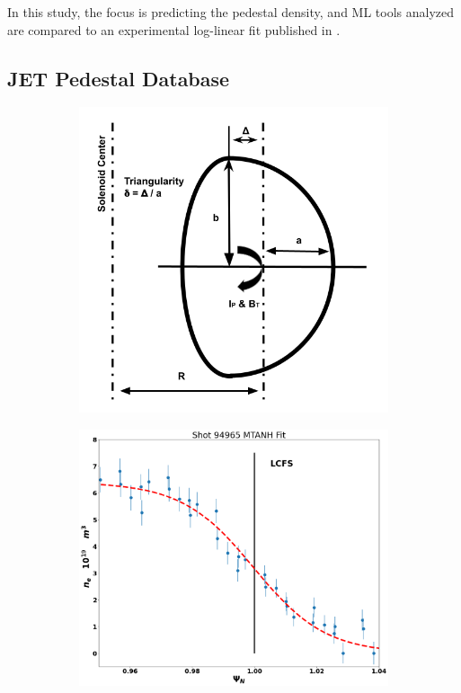 \documentclass[a4paper, twoside, final, 12pt]{article}
\begin{document}
In this study, the focus is predicting the pedestal density, and ML tools analyzed are compared to an experimental log-linear fit published in \cite{Frassinetti_2020}.

\subsection{JET Pedestal Database}
\begin{figure}
	\centering
	\begin{subfigure}{0.35\linewidth}
		\centering
		\includegraphics[scale=0.34]{./src/traingularity_crop_2}
		\caption{}
		\label{subfig:triangularity}
	\end{subfigure}\hfill
	\begin{subfigure}{0.60\linewidth}
		\centering
		\includegraphics[scale=0.22]{./src/MTANH_fit_21}

\end{subfigure}
\end{figure}
\end{document}
